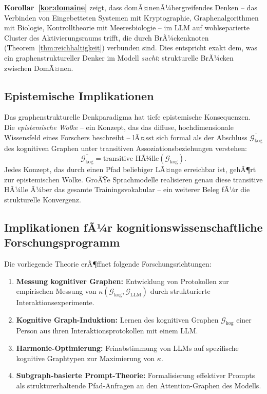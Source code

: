 ﻿\documentclass[12pt,a4paper]{article}
\theoremstyle{plain}
\theoremstyle{definition}
\theoremstyle{remark}
\newcommand{\GG}{\mathcal{G}}
\begin{document}
\textbf{Korollar~\ref{kor:domaine}} zeigt, dass domÃ¤nenÃ¼bergreifendes Denken -- das Verbinden von Eingebetteten Systemen mit Kryptographie, Graphenalgorithmen mit Biologie, Kontrolltheorie mit Meeresbiologie -- im LLM auf wohlseparierte Cluster des Aktivierungsraums trifft, die durch BrÃ¼ckenknoten (Theorem~\ref{thm:reichhaltigkeit}) verbunden sind. Dies entspricht exakt dem, was ein graphenstruktureller Denker im Modell \emph{sucht}: strukturelle BrÃ¼cken zwischen DomÃ¤nen.

\subsection{Epistemische Implikationen}

Das graphenstrukturelle Denkparadigma hat tiefe epistemische Konsequenzen. Die \emph{epistemische Wolke} -- ein Konzept, das das diffuse, hochdimensionale Wissensfeld eines Forschers beschreibt -- lÃ¤sst sich formal als der Abschluss $\overline{\GG_{\text{kog}}}$ des kognitiven Graphen unter transitiven Assoziationsbeziehungen verstehen:
\[
  \overline{\GG_{\text{kog}}} = \text{transitive HÃ¼lle}(\GG_{\text{kog}}).
\]
Jedes Konzept, das durch einen Pfad beliebiger LÃ¤nge erreichbar ist, gehÃ¶rt zur epistemischen Wolke. GroÃŸe Sprachmodelle realisieren genau diese transitive HÃ¼lle Ã¼ber das gesamte Trainingsvokabular -- ein weiterer Beleg fÃ¼r die strukturelle Konvergenz.

\subsection{Implikationen fÃ¼r kognitionswissenschaftliche Forschungsprogramm}

Die vorliegende Theorie erÃ¶ffnet folgende Forschungsrichtungen:

\begin{enumerate}
  \item \textbf{Messung kognitiver Graphen:} Entwicklung von Protokollen zur empirischen Messung von $\kappa(\GG_{\text{kog}}, \GG_{\text{LLM}})$ durch strukturierte Interaktionsexperimente.

  \item \textbf{Kognitive Graph-Induktion:} Lernen des kognitiven Graphen $\GG_{\text{kog}}$ einer Person aus ihren Interaktionsprotokollen mit einem LLM.

  \item \textbf{Harmonie-Optimierung:} Feinabstimmung von LLMs auf spezifische kognitive Graphtypen zur Maximierung von $\kappa$.

  \item \textbf{Subgraph-basierte Prompt-Theorie:} Formalisierung effektiver Prompts als strukturerhaltende Pfad-Anfragen an den Attention-Graphen des Modells.
\end{enumerate}
\end{document}
